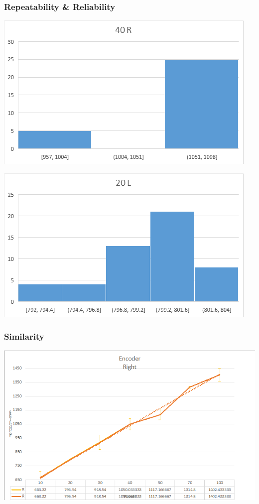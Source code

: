 \documentclass[11pt,a4paper,titlepage]{article}
\begin{document}
	\subsubsection{Repeatability \& Reliability}
	
	\includegraphics[width=\textwidth,height=\textheight,keepaspectratio]{encoderaReliablityGraph}
	
	\includegraphics[width=\textwidth,height=\textheight,keepaspectratio]{encoderaReliablityGraph2}
	
	\subsubsection{Similarity}
	
	\includegraphics[width=\textwidth,height=\textheight,keepaspectratio]{EncodersRight}
	
\end{document}
